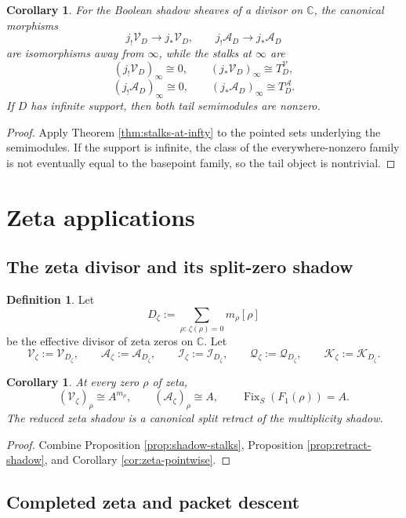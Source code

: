 \documentclass[11pt,a4paper]{article}
\newtheorem{corollary}[theorem]{Corollary}
\theoremstyle{definition}
\newtheorem{definition}[theorem]{Definition}
\theoremstyle{remark}
\DeclareMathOperator{\Fix}{Fix}
\newcommand{\CC}{\mathbb C}
\newcommand{\cV}{\mathcal V}
\newcommand{\cA}{\mathcal A}
\newcommand{\cQ}{\mathcal Q}
\newcommand{\cK}{\mathcal K}
\newcommand{\cI}{\mathcal I}
\begin{document}
\begin{corollary}\label{cor:boolean-tail-sheaf}
For the Boolean shadow sheaves of a divisor on $\CC$, the canonical morphisms
\[
j_!\cV_D\to j_*\cV_D,
\qquad
j_!\cA_D\to j_*\cA_D
\]
are isomorphisms away from $\infty$, while the stalks at $\infty$ are
\[
(j_!\cV_D)_\infty\cong 0,
\qquad
(j_*\cV_D)_\infty\cong T_D^{\cV},
\]
\[
(j_!\cA_D)_\infty\cong 0,
\qquad
(j_*\cA_D)_\infty\cong T_D^{\cA}.
\]
If $D$ has infinite support, then both tail semimodules are nonzero.
\end{corollary}

\begin{proof}
Apply Theorem \ref{thm:stalks-at-infty} to the pointed sets underlying the semimodules.  If the support is infinite, the class of the everywhere-nonzero family is not eventually equal to the basepoint family, so the tail object is nontrivial.
\end{proof}

\section{Zeta applications}

\subsection{The zeta divisor and its split-zero shadow}

\begin{definition}
Let
\[
D_\zeta:=\sum_{\rho:\,\zeta(\rho)=0} m_\rho[\rho]
\]
be the effective divisor of zeta zeros on $\CC$.  Let
\[
\cV_\zeta:=\cV_{D_\zeta},\qquad \cA_\zeta:=\cA_{D_\zeta},
\qquad \cI_\zeta:=\cI_{D_\zeta},\qquad \cQ_\zeta:=\cQ_{D_\zeta},\qquad \cK_\zeta:=\cK_{D_\zeta}.
\]
\end{definition}

\begin{corollary}\label{cor:zeta-shadow-sheaves}
At every zero $\rho$ of zeta,
\[
(\cV_\zeta)_\rho\cong A^{m_\rho},
\qquad
(\cA_\zeta)_\rho\cong A,
\qquad
\Fix_S(F_1(\rho))=A.
\]
The reduced zeta shadow is a canonical split retract of the multiplicity shadow.
\end{corollary}

\begin{proof}
Combine Proposition \ref{prop:shadow-stalks}, Proposition \ref{prop:retract-shadow}, and Corollary \ref{cor:zeta-pointwise}.
\end{proof}

\subsection{Completed zeta and packet descent}
\end{document}
